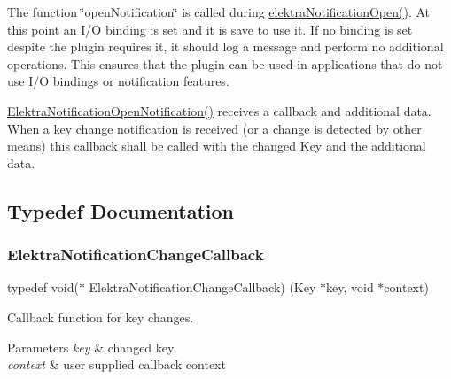 The function \char`\"{}open\+Notification\char`\"{} is called during \mbox{\hyperlink{group__kdbnotification_gaeae96154abdb5fdbf1b34a01e2b23e44}{elektra\+Notification\+Open()}}. At this point an I/O binding is set and it is save to use it. If no binding is set despite the plugin requires it, it should log a message and perform no additional operations. This ensures that the plugin can be used in applications that do not use I/O bindings or notification features.

\mbox{\hyperlink{kdbnotificationinternal_8h_adf7cf73a2740a3852b73d607b911a254}{Elektra\+Notification\+Open\+Notification()}} receives a callback and additional data. When a key change notification is received (or a change is detected by other means) this callback shall be called with the changed Key and the additional data. 

\subsection{Typedef Documentation}
\mbox{\label{group__kdbnotification_gad0d800e32a72d89780321e5723301eb9}} 
\subsubsection{\texorpdfstring{ElektraNotificationChangeCallback}{ElektraNotificationChangeCallback}}
{\footnotesize\ttfamily typedef void($\ast$ Elektra\+Notification\+Change\+Callback) (Key $\ast$key, void $\ast$context)}



Callback function for key changes. 


\begin{DoxyParams}{Parameters}
{\em key} & changed key \\
\hline
{\em context} & user supplied callback context \\
\hline
\end{DoxyParams}
\mbox{\label{group__kdbnotification_gaad19fb981cad906eb9c72bd602c7bb64}} 
